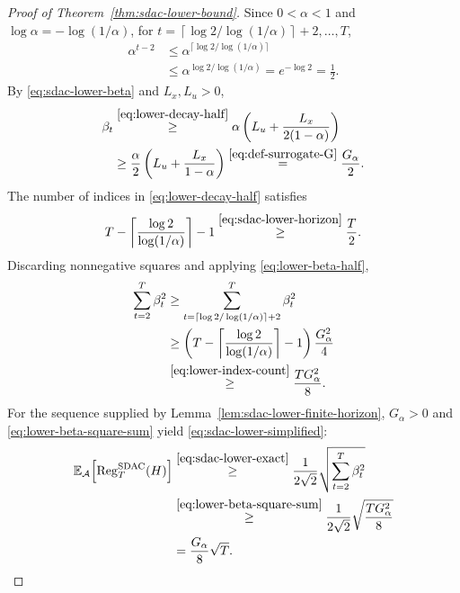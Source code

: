 \documentclass[journal]{IEEEtran}
\theoremstyle{remark}
\newcommand{\RegSDAC}[1]{\operatorname{Reg}_{#1}^{\mathrm{SDAC}}}
\begin{document}
\begin{proof}[Proof of Theorem~\ref{thm:sdac-lower-bound}]
Since $0<\alpha<1$ and $\log\alpha=-\log(1/\alpha)$, for
$t=\left\lceil\log 2/\log(1/\alpha)\right\rceil+2,\ldots,T$,
\begin{equation}
\label{eq:lower-decay-half}
\begin{aligned}
\alpha^{t-2}
&\le
\alpha^{\lceil\log 2/\log(1/\alpha)\rceil}\\
&\le
\alpha^{\log 2/\log(1/\alpha)}
=e^{-\log2}=\frac12.
\end{aligned}
\end{equation}
By \eqref{eq:sdac-lower-beta} and $L_x,L_u>0$,
\begin{equation}
\label{eq:lower-beta-half}
\begin{aligned}
\beta_t
&\overset{\eqref{eq:lower-decay-half}}{\ge}
\alpha\left(L_u+\frac{L_x}{2(1-\alpha)}\right)\\
&\ge
\frac{\alpha}{2}\left(L_u+\frac{L_x}{1-\alpha}\right)
\overset{\eqref{eq:def-surrogate-G}}{=}\frac{G_\alpha}{2}.
\end{aligned}
\end{equation}
The number of indices in \eqref{eq:lower-decay-half} satisfies
\begin{equation}
\label{eq:lower-index-count}
T-\left\lceil\frac{\log 2}{\log(1/\alpha)}\right\rceil-1
\overset{\eqref{eq:sdac-lower-horizon}}{\ge}\frac{T}{2}.
\end{equation}
Discarding nonnegative squares and applying \eqref{eq:lower-beta-half},
\begin{equation}
\label{eq:lower-beta-square-sum}
\begin{aligned}
\sum_{t=2}^T\beta_t^2
&\ge\sum_{t=\lceil\log 2/\log(1/\alpha)\rceil+2}^T\beta_t^2\\
&\ge\left(T-\left\lceil\frac{\log 2}{\log(1/\alpha)}\right\rceil-1\right)
\frac{G_\alpha^2}{4}\\
&\overset{\eqref{eq:lower-index-count}}{\ge}
\frac{TG_\alpha^2}{8}.
\end{aligned}
\end{equation}
For the sequence supplied by Lemma~\ref{lem:sdac-lower-finite-horizon},
$G_\alpha>0$ and \eqref{eq:lower-beta-square-sum} yield
\eqref{eq:sdac-lower-simplified}:
\begin{align*}
\mathbb{E}_{\mathcal{A}}\!\left[\RegSDAC{T}(H)\right]
&\overset{\eqref{eq:sdac-lower-exact}}{\ge}
\frac{1}{2\sqrt{2}}\sqrt{\sum_{t=2}^T\beta_t^2}\\
&\overset{\eqref{eq:lower-beta-square-sum}}{\ge}
\frac{1}{2\sqrt{2}}\sqrt{\frac{TG_\alpha^2}{8}}\\
&=\frac{G_\alpha}{8}\sqrt{T}.\qedhere
\end{align*}
\end{proof}
\end{document}
